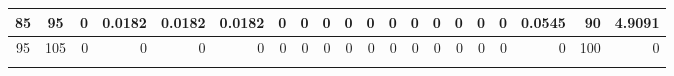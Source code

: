 \begin{table}[ht]
\begin{adjustbox}{width = \textwidth, center}
\begin{tabular}{|cc|r|r|r|r|r|r|r|r|r|r|r|r|r|r|r|rrr|}
        \cellcolor[HTML]{C9DAF8}85             & \cellcolor[HTML]{EBF1FC}95             & 0                                              & \cellcolor[HTML]{DEF2E8}0.0182                 & \cellcolor[HTML]{DEF2E8}0.0182                 & \cellcolor[HTML]{DEF2E8}0.0182                 & 0                                              & 0                                              & 0                                              & 0                                               & 0                                               & 0                                               & 0                                               & 0                                               & 0                                               & 0                                               & 0                                               & \multicolumn{1}{r|}{\cellcolor[HTML]{D9D2E9}0.0545}                             & \multicolumn{1}{r|}{\cellcolor[HTML]{D9D2E9}90}                         & \cellcolor[HTML]{D9D2E9}4.9091                                                                   \\ \hline
        \rowcolor[HTML]{FFFFFF} 
        \cellcolor[HTML]{C9DAF8}95             & \cellcolor[HTML]{EBF1FC}105            & 0                                              & 0                                              & 0                                              & 0                                              & 0                                              & 0                                              & 0                                              & 0                                               & 0                                               & 0                                               & 0                                               & 0                                               & 0                                               & 0                                               & 0                                               & \multicolumn{1}{r|}{\cellcolor[HTML]{D9D2E9}0}                                  & \multicolumn{1}{r|}{\cellcolor[HTML]{D9D2E9}100}                        & \cellcolor[HTML]{D9D2E9}0                                                                        \\ \hline
        \rowcolor[HTML]{FFFFFF} 

\end{tabular}
\end{adjustbox}
\end{table}
